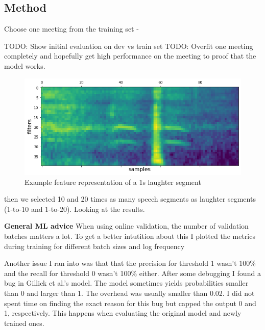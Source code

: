 \documentclass[bsc,frontabs,parskip,deptreport]{infthesis}
\begin{document}
\subsection{Method}
Choose one meeting from the training set - 

TODO: Show initial evaluation on dev vs train set
TODO: Overfit one meeting completely and hopefully get high performance on the meeting to proof that the model works.

\begin{figure}[htp]
    \centering
    \includegraphics[width=14cm]{imgs/sample_fbank_feat.png}
    \caption{Example feature representation of a 1s laughter segment}
    \label{fig:fbank-sample}
\end{figure}


\label{table:data-df}

then we selected 10 and 20 times as many speech segments as laughter segments (1-to-10 and 1-to-20). 
Looking at the results.




\textbf{General ML advice}
When using online validation, the number of validation batches matters a lot. To get a better intutition about this I plotted the metrics during training for different batch sizes and log frequency


Another issue I ran into was that that the precision for threshold 1 wasn't 100\% and the recall for threshold 0 wasn't 100\% either. After some debugging I found a bug in Gillick et al.'s model. 
The model sometimes yields probabilities smaller than 0 and larger than 1. The overhead was usually smaller than 0.02. I did not spent time on finding the exact reason for this bug but capped the output 0 and 1, respectively.
This happens when evaluating the original model and newly trained ones.
\end{document}
